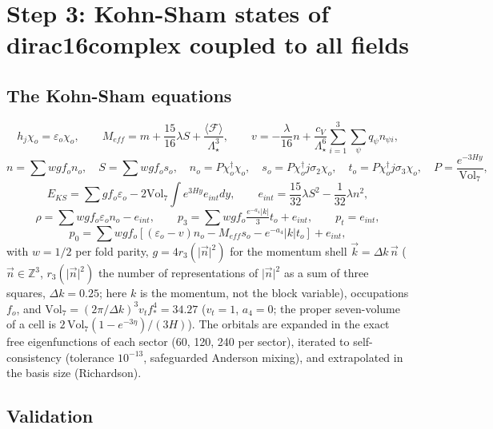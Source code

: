\documentclass[
  10pt,
]{article}
\begin{document}
\hypertarget{step-3-kohn-sham-states-of-dirac16complex-coupled-to-all-fields}{%
\section{Step 3: Kohn-Sham states of dirac16complex coupled to all
fields}\label{step-3-kohn-sham-states-of-dirac16complex-coupled-to-all-fields}}

\hypertarget{the-kohn-sham-equations}{%
\subsection{The Kohn-Sham equations}\label{the-kohn-sham-equations}}

\[ h_j\chi_o = \varepsilon_o\chi_o,\qquad M_{eff} = m + \frac{15}{16}\lambda S + \frac{\langle\mathcal F\rangle}{\Lambda_\star^3},\qquad
   v = -\frac{\lambda}{16}n + \frac{c_V}{\Lambda_\star^6}\sum_{i=1}^3\sum_\psi q_\psi n_{\psi i},\]
\[ n = \sum wgf_on_o,\quad S = \sum wgf_os_o,\quad n_o = P\chi_o^\dagger\chi_o,\quad s_o = P\chi_o^\dagger j\sigma_2\chi_o,\quad t_o = P\chi_o^\dagger j\sigma_3\chi_o,\quad P = \frac{e^{-3Hy}}{\mathrm{Vol}_7},\]
\[ E_{KS} = \sum gf_o\varepsilon_o - 2\mathrm{Vol}_7\int e^{3Hy}e_{int}dy,\qquad e_{int} = \frac{15}{32}\lambda S^2 - \frac{1}{32}\lambda n^2,\]
\[ \rho = \sum wgf_o\varepsilon_on_o - e_{int},\qquad p_3 = \sum wgf_o\tfrac{e^{-a_4}\lvert k\rvert}{3}t_o + e_{int},\qquad p_t = e_{int},\]
\[ p_0 = \sum wgf_o[(\varepsilon_o - v)n_o - M_{eff}s_o - e^{-a_4}\lvert k\rvert t_o] + e_{int},\]
with \(w = 1/2\) per fold parity, \(g = 4r_3(\lvert\vec n\rvert^2)\) for
the momentum shell \(\vec k = \Delta k\,\vec n\)
(\(\vec n \in \mathbb Z^3\), \(r_3(\lvert\vec n\rvert^2)\) the number of
representations of \(\lvert\vec n\rvert^2\) as a sum of three squares,
\(\Delta k = 0.25\); here \(k\) is the momentum, not the block
variable), occupations \(f_o\), and
\(\mathrm{Vol}_7 = (2\pi/\Delta k)^3v_tf_*^4 = 34.27\) (\(v_t = 1\),
\(a_4 = 0\); the proper seven-volume of a cell is
\(2\,\mathrm{Vol}_7(1 - e^{-3\eta})/(3H)\)). The orbitals are expanded
in the exact free eigenfunctions of each sector (60, 120, 240 per
sector), iterated to self-consistency (tolerance \(10^{-13}\),
safeguarded Anderson mixing), and extrapolated in the basis size
(Richardson).

\hypertarget{validation}{%
\subsection{Validation}\label{validation}}
\end{document}
